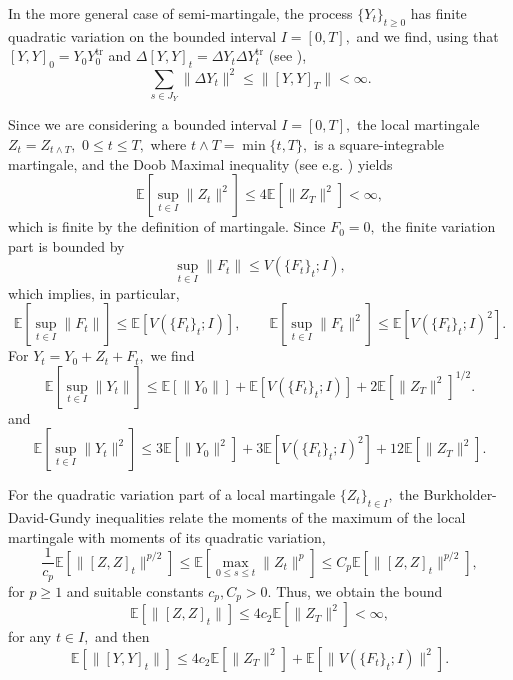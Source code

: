\documentclass[reqno,12pt]{amsart}
\theoremstyle{plain} %
\theoremstyle{definition} %
\newcommand{\tr}{{\operatorname{tr}}}
\begin{document}
In the more general case of semi-martingale, the process $\{Y_t\}_{t\geq 0}$ has finite quadratic variation \cite[Section II.6]{Protter2005} on the bounded interval $I=[0, T],$ and we find, using that $[Y, Y]_0 = Y_0 Y_0^\tr$ and $\Delta [Y, Y]_t = \Delta Y_t \Delta Y_t^\tr$ (see \cite[Theorem II.22]{Protter2005}),
\begin{equation}
    \label{estimatejumpsemimartingale}
    \sum_{s\in J_{Y}} \|\Delta Y_t\|^2 \leq \|[Y, Y]_T\| < \infty.
\end{equation}

Since we are considering a bounded interval $I=[0, T],$ the local martingale $Z_t = Z_{t \land T},$ $0\leq t \leq T,$ where $t \land T = \min\{t, T\},$ is a square-integrable martingale, and the Doob Maximal inequality (see e.g. \cite[Theorem I.20]{Protter2005}) yields
\begin{equation}
    \label{expectationZtsquaredfinite}
    \mathbb{E}\left[\sup_{t\in I} \|Z_t\|^2\right] \leq 4\mathbb{E}[\|Z_T\|^2] < \infty,
\end{equation}
which is finite by the definition of martingale. Since $F_0 = 0,$ the finite variation part is bounded by
\[
    \sup_{t\in I} \|F_t\| \leq V(\{F_t\}_t; I),
\]
which implies, in particular,
\[
    \mathbb{E}\left[\sup_{t\in I} \|F_t\|\right] \leq \mathbb{E}\left[V(\{F_t\}_t; I)\right], \qquad \mathbb{E}\left[\sup_{t\in I} \|F_t\|^2\right] \leq \mathbb{E}\left[V(\{F_t\}_t; I)^2\right].
\]
For $Y_t = Y_0 + Z_t + F_t,$ we find
\begin{equation}
    \label{expectationYtfinite}
    \mathbb{E}\left[\sup_{t\in I} \|Y_t\|\right] \leq \mathbb{E}[\|Y_0\|] + \mathbb{E}\left[V(\{F_t\}_t; I)\right] + 2\mathbb{E}\left[\|Z_T\|^2\right]^{1/2}.
\end{equation}
and
\begin{equation}
    \label{expectationYtsquaredfinite}
    \mathbb{E}\left[\sup_{t\in I} \|Y_t\|^2\right] \leq 3\mathbb{E}[\|Y_0\|^2] + 3\mathbb{E}\left[V(\{F_t\}_t; I)^2\right] + 12\mathbb{E}[\|Z_T\|^2].
\end{equation}

For the quadratic variation part of a local martingale $\{Z_t\}_{t\in I},$ the Burkholder-David-Gundy inequalities \cite[Theorem IV.48]{Protter2005} relate the moments of the maximum of the local martingale with moments of its quadratic variation,
\[
    \frac{1}{c_p}\mathbb{E}\left[\|[Z, Z]_t\|^{p/2}\right] \leq \mathbb{E}\left[\max_{0\leq s \leq t} \|Z_t\|^p\right] \leq C_p\mathbb{E}\left[\|[Z, Z]_t\|^{p/2}\right],
\]
for $p \geq 1$ and suitable constants $c_p, C_p > 0.$ Thus, we obtain the bound
\[
    \mathbb{E}\left[\|[Z, Z]_t\|\right] \leq 4c_2\mathbb{E}\left[\|Z_T\|^2\right] < \infty,
\]
for any $t\in I,$ and then
\begin{equation}
    \label{expectationofquadraticvariation}
    \mathbb{E}\left[\|[Y, Y]_t\|\right] \leq 4c_2\mathbb{E}\left[\|Z_T\|^2\right] + \mathbb{E}\left[\|V(\{F_t\}_t; I)\|^2\right].
\end{equation}
\end{document}

